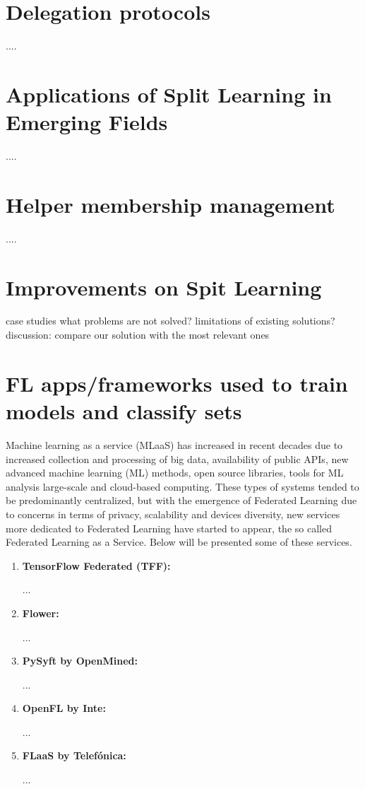 \section{Delegation protocols}
\label{sec:delegation_protocols}

....

\section{Applications of Split Learning in Emerging Fields}
\label{sec:application_of_sl_in_emerging_fields}


....

\section{Helper membership management}
\label{sec:helper_membership_management}

....

\section{Improvements on Spit Learning}
\label{sec:improvements_on_sl}

case studies
what problems are not solved?
limitations of existing solutions?
discussion: compare our solution with the most relevant ones

\section{FL apps/frameworks used to train models and classify sets}
\label{sec:fl_apps_and_frameworks}

Machine learning as a service (MLaaS) has increased in recent decades due to increased collection and processing of big data, availability of public APIs, new advanced machine learning (ML) methods, open source libraries, tools for ML analysis large-scale and cloud-based computing. These types of systems tended to be predominantly centralized, but with the emergence of Federated Learning due to concerns in terms of privacy, scalability and devices diversity, new services more dedicated to Federated Learning have started to appear, the so called Federated Learning as a Service. Below will be presented some of these services.

\begin{enumerate}
	\item \textbf{TensorFlow Federated (TFF):}
	
	...
	\item \textbf{Flower:}
	 
	...
	\item \textbf{PySyft by OpenMined:}
	 
	...
	\item \textbf{OpenFL by Inte:}
	 
	...
	\item \textbf{FLaaS by Telefónica:}
	
	...
	
\end{enumerate}



